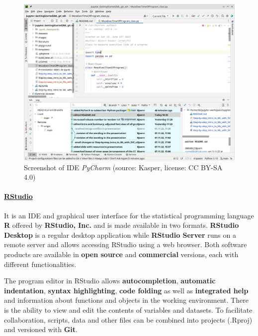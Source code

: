 \documentclass [oneside,10pt,a4paper,ngerman,BCOR10mm,headsepline,parindent,final]{scrartcl}
\begin{document}
\begin{figure}
\centering
\includegraphics{images/Screenshot_PyCharm.png}
\caption{Screenshot of IDE \emph{PyCharm} (source: Kasper, license: CC
BY-SA 4.0)}
\end{figure}

    \hypertarget{rstudio}{%
\paragraph{\texorpdfstring{\href{https://en.wikipedia.org/wiki/RStudio}{RStudio}}{RStudio}}\label{rstudio}}

It is an IDE and graphical user interface for the statistical
programming language \textbf{R} offered by \textbf{RStudio, Inc.} and is
made available in two formats. \textbf{RStudio Desktop} is a regular
desktop application while \textbf{RStudio Server} runs on a remote
server and allows accessing RStudio using a web browser. Both software
products are available in \textbf{open source} and \textbf{commercial}
versions, each with different functionalities.

The program editor in RStudio allows \textbf{autocompletion},
\textbf{automatic indentation}, \textbf{syntax highlighting},
\textbf{code folding} as well as \textbf{integrated help} and
information about functions and objects in the working environment.
There is the ability to view and edit the contents of variables and
datasets. To facilitate collaboration, scripts, data and other files can
be combined into projects (.Rproj) and versioned with \textbf{Git}.
\end{document}
